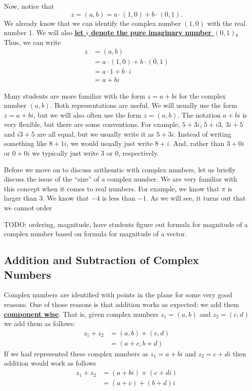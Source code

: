 \documentclass[11pt]{article}
\renewcommand\emph[1]{\underline{\bf{#1}}} %
\theoremstyle{definition}
\begin{document}
Now, notice that
\[ z = (a,b) = a \cdot (1,0) + b \cdot (0,1). \]
We already know that we can identify the complex number $(1,0)$ with the real number 1. We will also \emph{let $i$ denote the pure imaginary number $(0,1)$.}
Thus, we can write
\begin{align*}
 z &= (a,b)\\ 
   &= a \cdot (1,0) + b \cdot (0,1)\\
   &= a\cdot 1 + b\cdot i\\
   &= a + bi
\end{align*}

Many students are more familiar with the form $z = a + bi$ for the complex number $(a,b)$. Both representations are useful. We will usually
use the form $z = a+bi$, but we will also often use the form $z=(a,b)$. The notation $a+bi$ is very flexible, but there are some conventions. For example,
$5+3i$, $5+i3$, $3i+5$ and $i3+5$ are all equal, but we usually write it as $5+3i$. Instead of writing something like $8+1i$, we would usually 
just write $8+i$. And, rather than $3+0i$ or $0+0i$ we typically just write $3$ or $0$, respectively.

Before we move on to discuss arithemtic with complex numbers, let us briefly discuss the issue of the ``size'' of a complex number. We are very
familiar with this concept when it comes to real numbers. For example, we know that $\pi$ is larger than 3. We know that $-4$ is less than $-1$. As we will
see, it turns out that we cannot order

TODO: ordering, magnitude, have students figure out formula for magnitude of a complex number based on formula for magnitude of a vector.

\subsection{Addition and Subtraction of Complex Numbers}

Complex numbers are identified with points in the plane for some very good reasons. One of those reasons is that addition works as expected: we
add them \emph{component wise}. That is, given complex numbers $z_1=(a,b)$ and $z_2 = (c,d)$ we add them as follows:
\begin{align*}
  z_1 + z_2 &= (a,b)+(c,d)\\
            &= (a+c, b+d)
\end{align*}
If we had represented these complex numbers as $z_1=a+bi$ and $z_2=c+di$ then addition would work as follows
\begin{align*}
  z_1 + z_2 &= (a+bi)+(c+di)\\
            &= (a+c) + (b+d)i
\end{align*}
\end{document}
